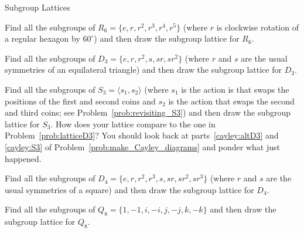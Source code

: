 \begin{section}{Subgroup Lattices}
\begin{problem}
Find all the subgroups of $R_6=\{e,r,r^2,r^3,r^4,r^5\}$ (where $r$ is clockwise rotation of a regular hexagon by $60^{\circ}$) and then draw the subgroup lattice for $R_6$.
\end{problem}

\begin{problem}\label{prob:latticeD3}
Find all the subgroups of $D_3=\{e,r,r^2,s,sr,sr^2\}$ (where $r$ and $s$ are the usual symmetries of an equilateral triangle) and then draw the subgroup lattice for $D_3$.
\end{problem}

\begin{problem}
Find all the subgroups of $S_3=\langle s_1, s_2\rangle$ (where $s_1$ is the action is that swaps the positions of the first and second coins and $s_2$ is the action that swaps the second and third coins; see Problem~\ref{prob:revisiting_S3}) and then draw the subgroup lattice for $S_3$. How does your lattice compare to the one in Problem~\ref{prob:latticeD3}? You should look back at parts~\ref{cayley:altD3} and \ref{cayley:S3} of Problem~\ref{prob:make_Cayley_diagrams} and ponder what just happened.
\end{problem}

\begin{problem}
Find all the subgroups of $D_4=\{e,r,r^2,r^3,s,sr,sr^2,sr^3\}$ (where $r$ and $s$ are the usual symmetries of a square) and then draw the subgroup lattice for $D_4$.
\end{problem}

\begin{problem}
Find all the subgroups of $Q_8=\{1,-1,i,-i,j,-j,k,-k\}$ and then draw the subgroup lattice for $Q_8$.
\end{problem}

\end{section}


